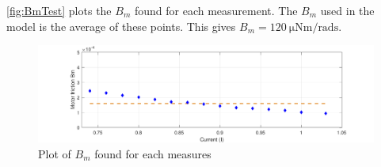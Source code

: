 \autoref{fig:BmTest} plots the $B_m$ found for each measurement. The $B_m$ used in the model is the average of these points. This gives $B_m=\SI{120}{\micro\newton\meter\per\radian\second}$.

\begin{figure}[htbp]
	\centering
	\includegraphics[width=\textwidth]{figures/appendix/Motor&GearTests/PlotBm}
	\caption{Plot of $B_m$ found for each measures}\label{fig:BmTest}
\end{figure}
